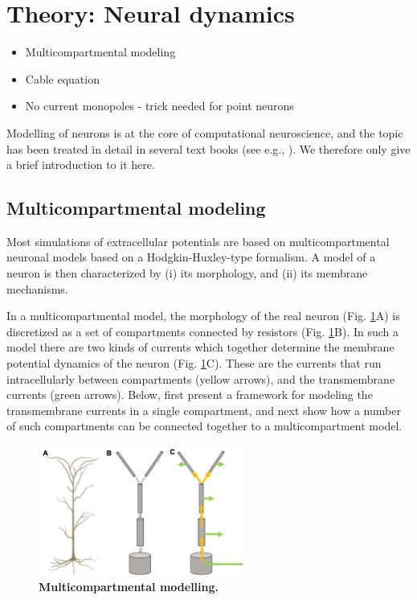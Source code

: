 \section{Theory: Neural dynamics}
\label{sec:NeuralDynamics}
\begin{itemize}
\item Multicompartmental modeling
\item Cable equation
\item No current monopoles - trick needed for point neurons
\end{itemize}

Modelling of neurons is at the core of computational neuroscience, and the topic has been treated in detail in several text books (see e.g., \cite{KockSegev1998, Koch1999, Hille2001, Dayan2005, Sterratt2011}). We therefore only give a brief introduction to it here. 

\subsection{Multicompartmental modeling}
Most simulations of extracellular potentials are based on multicompartmental neuronal models based on a Hodgkin-Huxley-type formalism. A model of a neuron is then characterized by (i) its morphology, and (ii) its membrane mechanisms. 

In a multicompartmental model, the morphology of the real neuron (Fig. \ref{fig:multicomp}A) is discretized as a set of compartments connected by resistors (Fig. \ref{fig:multicomp}B). In such a model there are two kinds of currents which together determine the membrane potential dynamics of the neuron (Fig. \ref{fig:multicomp}C). These are the currents that run intracellularly between compartments (yellow arrows), and the transmembrane currents (green arrows). Below, first present a framework for modeling the transmembrane currents in a single compartment, and next show how a number of such compartments can be connected together to a multicompartment model.

\begin{figure}[!ht]
\begin{center}
\includegraphics[width=0.6\textwidth]{Figures/Multicomp.png}
\end{center}
\caption{\textbf{Multicompartmental modelling.} 
}
\label{fig:multicomp}
\end{figure}


